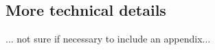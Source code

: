 \documentclass[article]{jss}
\begin{document}
\begin{appendix}

\section{More technical details} \label{app:technical}

... not sure if necessary to include an appendix...

% 




\end{appendix}
\end{document}
